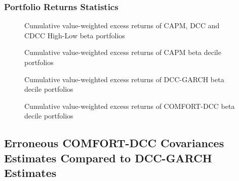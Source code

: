 \documentclass[11pt,a4paper]{article}
\begin{document}
\subsubsection{Portfolio Returns Statistics}

\begin{figure}[H]
	\vspace{-12mm}
	\hspace{-5mm}\vspace{-15mm}
	\caption{Cumulative value-weighted excess returns of CAPM, DCC and CDCC High-Low beta portfolios}
	\label{figure:vw_cum_ret_high-low_appendix}
\end{figure}


\begin{figure}[H]
	\vspace{-12mm}
	\hspace{-5mm}\vspace{-15mm}
	\caption{Cumulative value-weighted excess returns of CAPM beta decile portfolios}
	\label{figure:vw_cum_ret_deciles_CAPM}
\end{figure}

\begin{figure}[H]
	\vspace{-12mm}
	\hspace{-5mm}\vspace{-15mm}
	\caption{Cumulative value-weighted excess returns of DCC-GARCH beta decile portfolios}
	\label{figure:vw_cum_ret_deciles_DCC}
\end{figure}

\begin{figure}[H]
	\vspace{-12mm}
	\hspace{-5mm}\vspace{-15mm}
	\caption{Cumulative value-weighted excess returns of COMFORT-DCC beta decile portfolios}
	\label{figure:vw_cum_ret_deciles_COMFORT-DCC}
\end{figure}







\subsection{Erroneous COMFORT-DCC Covariances Estimates Compared to DCC-GARCH Estimates} \label{sec:appendix:erroneous_covariances}
\end{document}
